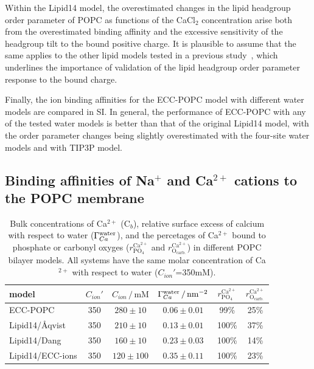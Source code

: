 \documentclass[journal=jpcbfk,manuscript=article]{achemso}
\begin{document}
Within the Lipid14 model, the overestimated changes in the lipid headgroup order parameter of POPC  as functions of the CaCl$_2$ concentration arise both from the overestimated binding affinity and the excessive sensitivity of the headgroup tilt to the bound positive charge. It is plausible to assume that the same applies to the other lipid models tested in a previous study~\cite{catte16}, which underlines the importance of validation of the lipid headgroup order parameter response to the bound charge. 

Finally, the ion binding affinities for the ECC-POPC model with different water models are compared in SI. In general, the performance of ECC-POPC with any of the tested water models is better than that of the original Lipid14 model, with the order parameter changes being slightly overestimated with the four-site water models and with TIP3P model.


\subsection{Binding affinities of Na$^+$ and Ca$^{2+}$ cations to the POPC membrane}
\label{sec:affinity}

\begin{table}[tb!]
  \caption{Bulk concentrations of Ca$^{2+}$ (C$_b$), relative surface excess of calcium with respect to water ($\Gamma_{Ca}^{\rm water}$),
    and the percetages of Ca$^{2+}$ bound to phosphate or carbonyl oxyges ($r^\mathrm{Ca^{2+}} _\mathrm{PO_4} $ and $r^\mathrm{Ca^{2+}} _\mathrm{O_{carb.}}$)
    in different POPC bilayer models. All systems have the same molar concentration of Ca$^{2+}$ with respect to water ($C_{ion}'$=350mM).
  \label{tab:binding}}
  \begin{tabular}{l|c c | c | c c}
    model                  & $C_{ion}'$ & $C_{ion}\,/\,\mathrm{mM}$ & $\Gamma_{Ca}^{\rm water} \,/\, \mathrm{nm}^{-2}$  & $r^\mathrm{Ca^{2+}} _\mathrm{PO_4} $ & $r^\mathrm{Ca^{2+}} _\mathrm{O_{carb.}} $ \\
    \hline
    ECC-POPC             &  350  &  $280\pm 10 $  &  $0.06 \pm 0.01 $                           &  99\%  &    25\%    \\
    Lipid14/\AA{}qvist     &  350  &  $210\pm 10 $  &  $0.13 \pm 0.01 $                          & 100\%  &    37\%     \\
    Lipid14/Dang           &  350  &  $160\pm 10 $  &  $0.23 \pm 0.03 $                            & 100\%  &    14\%    \\
    Lipid14/ECC-ions       &  350  &  $120\pm 100$  &  $0.35 \pm 0.11 $                         & 100\%  &    23\%    \\
  \end{tabular}
\end{table}
\end{document}
